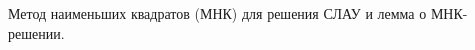 \documentclass[__main__.tex]{subfiles}
\begin{document}
Метод наименьших квадратов (МНК) для решения СЛАУ и лемма о МНК-решении.
\end{document}
